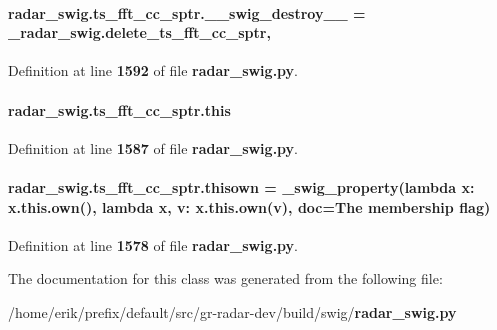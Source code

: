 \paragraph[{\+\_\+\+\_\+swig\+\_\+destroy\+\_\+\+\_\+}]{\setlength{\rightskip}{0pt plus 5cm}radar\+\_\+swig.\+ts\+\_\+fft\+\_\+cc\+\_\+sptr.\+\_\+\+\_\+swig\+\_\+destroy\+\_\+\+\_\+ = \+\_\+radar\+\_\+swig.\+delete\+\_\+ts\+\_\+fft\+\_\+cc\+\_\+sptr\hspace{0.3cm}{\ttfamily [static]}, {\ttfamily [private]}}\label{classradar__swig_1_1ts__fft__cc__sptr_af16550e7df3e5f9d68d55070ce6c2f25}


Definition at line {\bf 1592} of file {\bf radar\+\_\+swig.\+py}.

\paragraph[{this}]{\setlength{\rightskip}{0pt plus 5cm}radar\+\_\+swig.\+ts\+\_\+fft\+\_\+cc\+\_\+sptr.\+this}\label{classradar__swig_1_1ts__fft__cc__sptr_a08805071a7f92b0381c9dfcf480016b8}


Definition at line {\bf 1587} of file {\bf radar\+\_\+swig.\+py}.

\paragraph[{thisown}]{\setlength{\rightskip}{0pt plus 5cm}radar\+\_\+swig.\+ts\+\_\+fft\+\_\+cc\+\_\+sptr.\+thisown = {\bf \+\_\+swig\+\_\+property}(lambda x\+: x.\+this.\+own(), lambda {\bf x}, v\+: x.\+this.\+own(v), doc=\textquotesingle{}The membership flag\textquotesingle{})\hspace{0.3cm}{\ttfamily [static]}}\label{classradar__swig_1_1ts__fft__cc__sptr_adf039ca865d994781c505799fd48055d}


Definition at line {\bf 1578} of file {\bf radar\+\_\+swig.\+py}.



The documentation for this class was generated from the following file\+:\begin{DoxyCompactItemize}
\item 
/home/erik/prefix/default/src/gr-\/radar-\/dev/build/swig/{\bf radar\+\_\+swig.\+py}\end{DoxyCompactItemize}
